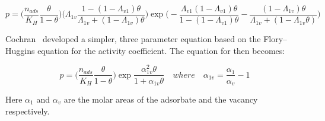 \begin{equation}\label{eqn:pyg:wvst}
    p = \bigg( \frac{n_{ads}}{K_H} \frac{\theta}{1-\theta} \bigg)
    \bigg( \Lambda_{1v} \frac{1-(1-\Lambda_{v1})\theta}{\Lambda_{1v}+(1-\Lambda_{1v})\theta} \bigg)
    \exp{\bigg( -\frac{\Lambda_{v1}(1-\Lambda_{v1})\theta}{1-(1-\Lambda_{v1})\theta}
    -\frac{(1 - \Lambda_{1v})\theta}{\Lambda_{1v} + (1-\Lambda_{1v}\theta)} \bigg)}
\end{equation}

Cochran~\cite{cochranVacancySolutionTheory1985} 
developed a simpler, three parameter equation based on
the Flory–Huggins equation for the activity coefficient.
The equation for then becomes:

\begin{equation}\label{eqn:pyg:fhvst}
    p = \bigg( \frac{n_{ads}}{K_H} \frac{\theta}{1-\theta} \bigg)
        \exp{\frac{\alpha^2_{1v}\theta}{1+\alpha_{1v}\theta}} 
        \quad where \quad
    \alpha_{1v} = \frac{\alpha_{1}}{\alpha_{v}} - 1
\end{equation}

Here \(\alpha_{1}\) and \(\alpha_{v}\) are the molar areas of the adsorbate
and the vacancy respectively.
